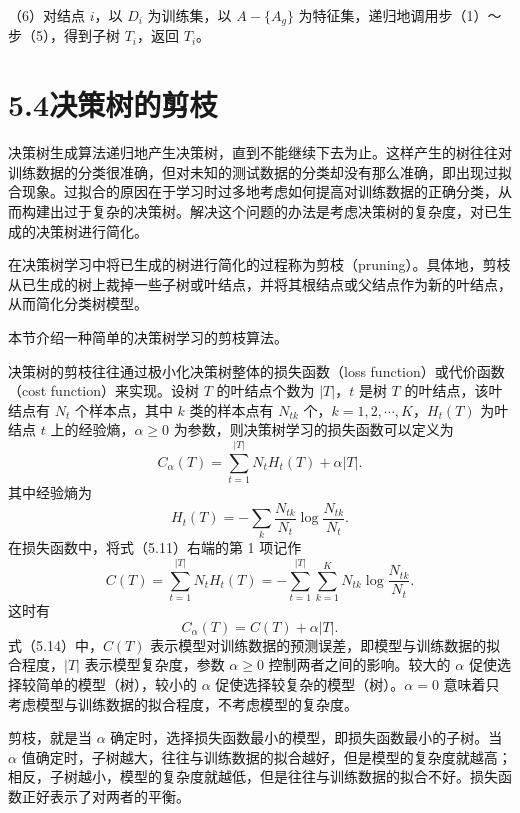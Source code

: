 \documentclass[UTF8,12pt,a4paper,fontset=fandol]{ctexart}
\begin{document}
（6）对结点 $i$，以 $D_i$ 为训练集，以 $A-\{A_g\}$ 为特征集，递归地调用步（1）～步（5），得到子树 $T_i$，返回 $T_i$。

\section*{5.4\quad 决策树的剪枝}

决策树生成算法递归地产生决策树，直到不能继续下去为止。这样产生的树往往对训练数据的分类很准确，但对未知的测试数据的分类却没有那么准确，即出现过拟合现象。过拟合的原因在于学习时过多地考虑如何提高对训练数据的正确分类，从而构建出过于复杂的决策树。解决这个问题的办法是考虑决策树的复杂度，对已生成的决策树进行简化。

在决策树学习中将已生成的树进行简化的过程称为剪枝（pruning）。具体地，剪枝从已生成的树上裁掉一些子树或叶结点，并将其根结点或父结点作为新的叶结点，从而简化分类树模型。

本节介绍一种简单的决策树学习的剪枝算法。

决策树的剪枝往往通过极小化决策树整体的损失函数（loss function）或代价函数（cost function）来实现。设树 $T$ 的叶结点个数为 $|T|$，$t$ 是树 $T$ 的叶结点，该叶结点有 $N_t$ 个样本点，其中 $k$ 类的样本点有 $N_{tk}$ 个，$k=1,2,\cdots,K$，$H_t(T)$ 为叶结点 $t$ 上的经验熵，$\alpha\ge0$ 为参数，则决策树学习的损失函数可以定义为
\begin{equation}
  C_\alpha(T)=\sum_{t=1}^{|T|}N_tH_t(T)+\alpha|T|.
  \tag{5.11}
\end{equation}
其中经验熵为
\begin{equation}
  H_t(T)=-\sum_k\frac{N_{tk}}{N_t}\log\frac{N_{tk}}{N_t}.
  \tag{5.12}
\end{equation}
在损失函数中，将式（5.11）右端的第 1 项记作
\begin{equation}
  C(T)=\sum_{t=1}^{|T|}N_tH_t(T)
  =-\sum_{t=1}^{|T|}\sum_{k=1}^{K}N_{tk}\log\frac{N_{tk}}{N_t}.
  \tag{5.13}
\end{equation}
这时有
\begin{equation}
  C_\alpha(T)=C(T)+\alpha|T|.
  \tag{5.14}
\end{equation}
式（5.14）中，$C(T)$ 表示模型对训练数据的预测误差，即模型与训练数据的拟合程度，$|T|$ 表示模型复杂度，参数 $\alpha\ge0$ 控制两者之间的影响。较大的 $\alpha$ 促使选择较简单的模型（树），较小的 $\alpha$ 促使选择较复杂的模型（树）。$\alpha=0$ 意味着只考虑模型与训练数据的拟合程度，不考虑模型的复杂度。

剪枝，就是当 $\alpha$ 确定时，选择损失函数最小的模型，即损失函数最小的子树。当 $\alpha$ 值确定时，子树越大，往往与训练数据的拟合越好，但是模型的复杂度就越高；相反，子树越小，模型的复杂度就越低，但是往往与训练数据的拟合不好。损失函数正好表示了对两者的平衡。
\end{document}
